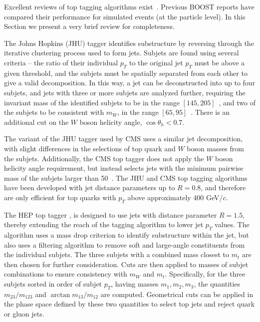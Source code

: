 Excellent reviews of top tagging algorithms exist~\cite{Plehn:2011tg}. 
Previous BOOST reports have compared their 
performance for simulated events (at the particle level). In this 
Section we present a very brief review for completeness. 

The Johns Hopkins (JHU) tagger \cite{Kaplan:2008ie} identifies 
substructure by reversing through the iterative clustering process 
used to form jets.  Subjets are found using several criteria -- the 
ratio of their individual $p_T$ to the original jet $p_T$ must be above 
a given threshold, and the subjets must be spatially separated from each 
other to give a valid decomposition.  In this way, a jet can be 
deconstructed into up to four subjets, and jets with three or more 
subjets are analyzed further, requiring the invariant mass of the 
identified subjets to be in the range $[145, 205]$~\gev{}, and two 
of the subjets to be consistent with $m_W$, in the range $[65,95]$~\gev.  
There is an additional cut on the $W$ boson helicity angle, 
$\cos \theta_h < 0.7$. 

The variant of the JHU tagger used by CMS\cite{CMS-PAS-JME-09-001} uses 
a similar jet decomposition, with slight differences in the selections of 
top quark and $W$ boson masses from the subjets.  Additionally, the CMS 
top tagger does not apply the $W$ boson helicity angle requirement, but
instead selects jets with the
minimum pairwise mass of the subjets larger than 50~\gev.
The JHU and CMS top tagging algorithms have been developed with jet 
distance parameters up to $R = 0.8$, and therefore are only efficient 
for top quarks with $p_T$ above approximately 400 GeV/$c$.  

The HEP top tagger \cite{Plehn:2010st}, is designed to use jets with 
distance parameter $R=1.5$, thereby extending the reach of the tagging 
algorithm to lower jet $p_T$ values.  The algorithm uses a mass drop 
criterion to identify substructure within the jet, but also uses a 
filtering algorithm to remove soft and large-angle constituents from the 
individual subjets.  The three subjets with a combined mass closest to 
$m_t$ are then chosen for further consideration.  Cuts are then applied 
to masses of subjet combinations to ensure consistency with $m_W$ and 
$m_t$.  Specifically, for the three subjets sorted in order of subjet 
$p_T$, having masses $m_1, m_2, m_3$, the quantities $m_{23}/m_{123}$ 
and $\arctan m_{13}/m_{12}$ are computed.  Geometrical cuts can be 
applied in the phase space defined by these two quantities 
to select top jets and reject quark or gluon jets.  

